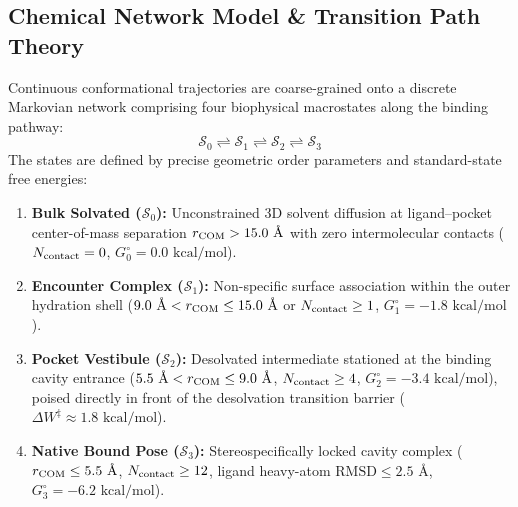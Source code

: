 \documentclass[journal=jpcbfk,manuscript=article,layout=twocolumn]{achemso}
\begin{document}
\subsection{Chemical Network Model \& Transition Path Theory}
Continuous conformational trajectories are coarse-grained onto a discrete Markovian network comprising four biophysical macrostates along the binding pathway:
\begin{equation}
\mathcal{S}_0 \rightleftharpoons \mathcal{S}_1 \rightleftharpoons \mathcal{S}_2 \rightleftharpoons \mathcal{S}_3
\end{equation}
The states are defined by precise geometric order parameters and standard-state free energies:
\begin{enumerate}
\item \textbf{Bulk Solvated ($\mathcal{S}_0$):} Unconstrained 3D solvent diffusion at ligand--pocket center-of-mass separation $r_{\rm COM} > 15.0\text{ \AA}$ with zero intermolecular contacts ($N_{\rm contact} = 0$, $G_0^\circ = 0.0\text{ kcal/mol}$).
\item \textbf{Encounter Complex ($\mathcal{S}_1$):} Non-specific surface association within the outer hydration shell ($9.0\text{ \AA} < r_{\rm COM} \le 15.0\text{ \AA}$ or $N_{\rm contact} \ge 1$, $G_1^\circ = -1.8\text{ kcal/mol}$).
\item \textbf{Pocket Vestibule ($\mathcal{S}_2$):} Desolvated intermediate stationed at the binding cavity entrance ($5.5\text{ \AA} < r_{\rm COM} \le 9.0\text{ \AA}$, $N_{\rm contact} \ge 4$, $G_2^\circ = -3.4\text{ kcal/mol}$), poised directly in front of the desolvation transition barrier ($\Delta W^\ddagger \approx 1.8\text{ kcal/mol}$).
\item \textbf{Native Bound Pose ($\mathcal{S}_3$):} Stereospecifically locked cavity complex ($r_{\rm COM} \le 5.5\text{ \AA}$, $N_{\rm contact} \ge 12$, ligand heavy-atom $\text{RMSD} \le 2.5\text{ \AA}$, $G_3^\circ = -6.2\text{ kcal/mol}$).
\end{enumerate}
\end{document}
